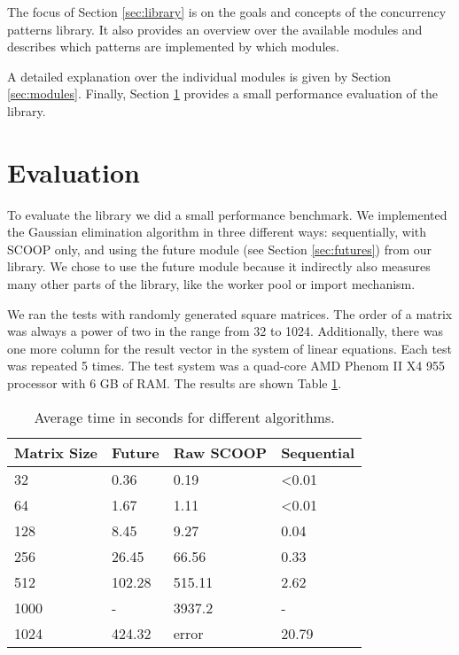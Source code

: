 \documentclass[a4paper,10pt,titlepage]{article}
\begin{document}
The focus of Section \ref{sec:library} is on the goals and concepts of the concurrency patterns library.
It also provides an overview over the available modules and describes which patterns are implemented by which modules.

A detailed explanation over the individual modules is given by Section \ref{sec:modules}.
Finally, Section \ref{sec:evaluation} provides a small performance evaluation of the library.






\section{Evaluation}
\label {sec:evaluation}

To evaluate the library we did a small performance benchmark.
We implemented the Gaussian elimination algorithm in three different ways: sequentially, with SCOOP only, and using the future module (see Section \ref{sec:futures}) from our library.
We chose to use the future module because it indirectly also measures many other parts of the library, like the worker pool or import mechanism.

We ran the tests with randomly generated square matrices.
The order of a matrix was always a power of two in the range from 32 to 1024.
Additionally, there was one more column for the result vector in the system of linear equations.
Each test was repeated 5 times.
The test system was a quad-core AMD Phenom II X4 955 processor with 6 GB of RAM.
The results are shown Table \ref{table:perf-results}.

\begin{table} [h]
\centering
\begin{tabular}{|l|l l l|} 
\hline
Matrix Size & Future & Raw SCOOP & Sequential\\
\hline
32 & 0.36 & 0.19 &  \textless 0.01\\
64 & 1.67 & 1.11 & \textless 0.01\\
128 & 8.45 & 9.27 & 0.04\\
256 & 26.45 & 66.56 & 0.33\\
512 & 102.28 & 515.11 & 2.62\\
1000 & - &  3937.2 & - \\
1024 & 424.32 & error & 20.79 \\
\hline
\end{tabular}
\caption{Average time in seconds for different algorithms.}
\label{table:perf-results}
\end{table}
\end{document}
